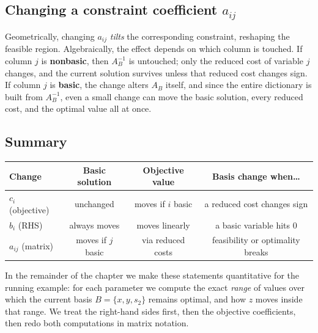 \subsection{Changing a constraint coefficient \( a_{ij} \)}

Geometrically, changing \(a_{ij}\) \emph{tilts} the corresponding constraint, reshaping the feasible region. Algebraically, the effect depends on which column is touched. If column \(j\) is \textbf{nonbasic}, then \(A_B^{-1}\) is untouched; only the reduced cost of variable \(j\) changes, and the current solution survives unless that reduced cost changes sign. If column \(j\) is \textbf{basic}, the change alters \(A_B\) itself, and since the entire dictionary is built from \(A_B^{-1}\), even a small change can move the basic solution, every reduced cost, and the optimal value all at once.

\subsection{Summary}

\begin{center}
\renewcommand{\arraystretch}{1.3}
\begin{tabular}{@{}lccc@{}}
\toprule
Change & Basic solution & Objective value & Basis change when\ldots\\
\midrule
$c_i$ (objective) & unchanged & moves if $i$ basic & a reduced cost changes sign\\
$b_i$ (RHS)       & always moves & moves linearly & a basic variable hits $0$\\
$a_{ij}$ (matrix) & moves if $j$ basic & via reduced costs & feasibility or optimality breaks\\
\bottomrule
\end{tabular}
\par{}\label{tab:sensitivity-LP-tab01}%

\end{center}

In the remainder of the chapter we make these statements quantitative for the running example: for each parameter we compute the exact \emph{range} of values over which the current basis \( B = \{x,y,s_2\} \) remains optimal, and how \(z\) moves inside that range. We treat the right-hand sides first, then the objective coefficients, then redo both computations in matrix notation.

